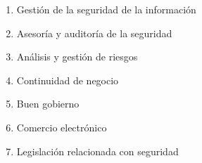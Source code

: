 \documentclass[10pt,a4paper]{book}
\begin{document}
\begin{enumerate}

\item Gestión de la seguridad de la información

\item Asesoría y auditoría de la seguridad

\item Análisis y gestión de riesgos

\item Continuidad de negocio

\item Buen gobierno

\item Comercio electrónico

\item Legislación relacionada con seguridad

\end{enumerate}
\end{document}
